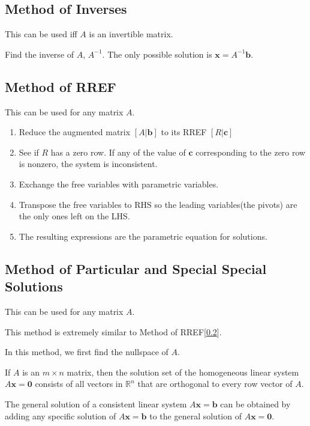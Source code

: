 \documentclass{report}
\begin{document}
		\subsection{Method of Inverses}
		
		This can be used iff $A$ is an invertible matrix.
		
		Find the inverse of $A$, $A^{-1}$.
		The only possible solution is $\bm{x}=A^{-1}\bm{b}$.
		
		\subsection{Method of RREF}\label{mthd_rref}
		
		This can be used for any matrix $A$.
		
		\begin{enumerate}
			\item Reduce the augmented matrix $\left[A|\bm{b}\right]$ to its RREF $\left[R|\bm{c}\right]$
			\item See if $R$ has a zero row. If any of the value of $\bm{c}$ corresponding to the zero row is nonzero, the system is inconsistent.
			\item Exchange the free variables with parametric variables.
			\item Transpose the free variables to RHS so the leading variables(the pivots) are the only ones left on the LHS.
			\item The resulting expressions are the parametric equation for solutions.
		\end{enumerate}
		
		\subsection{Method of Particular and Special Special Solutions}
			
			This can be used for any matrix $A$.
			
			This method is extremely similar to Method of RREF[\ref{mthd_rref}].
			
			In this method, we first find the nullspace of $A$.
			
			\begin{thm}
				If $A$ is an $m \times n$ matrix, then the solution set of the homogeneous linear system $A\bm{x}=\bm{0}$ consists of all vectors in $\mathbb{R}^n$ that are orthogonal to every row vector of $A$.
			\end{thm}
			
			\begin{thm}
				The general solution of a consistent linear system $A\bm{x}=\bm{b}$ can be obtained by adding any specific solution of $A\bm{x}=\bm{b}$ to the general solution of $A\bm{x}=\bm{0}$.
			\end{thm}
			
\end{document}
